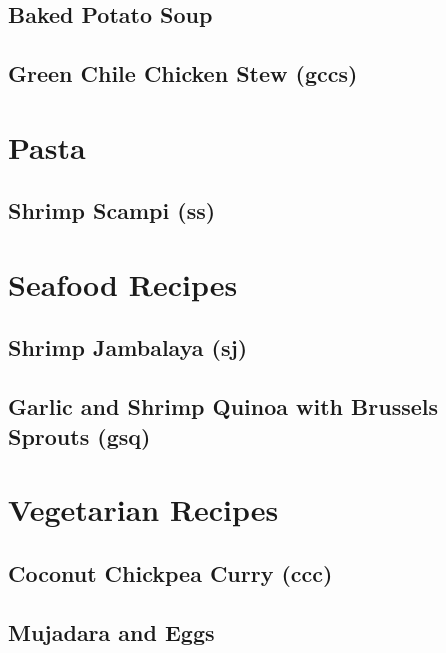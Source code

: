 \documentclass{report}
\begin{document}
\section{Baked Potato Soup}

\newpage 


\section{Green Chile Chicken Stew (gccs)}


\chapter{Pasta}
\newpage

\section{Shrimp Scampi (ss)}


\chapter{Seafood Recipes}
\newpage

\section{Shrimp Jambalaya (sj)}

\newpage


\section{Garlic and Shrimp Quinoa with Brussels Sprouts (gsq)}


\chapter{Vegetarian Recipes}
\newpage 
\section{Coconut Chickpea Curry (ccc)}

\newpage 
\section{Mujadara and Eggs}

\newpage
\end{document}
